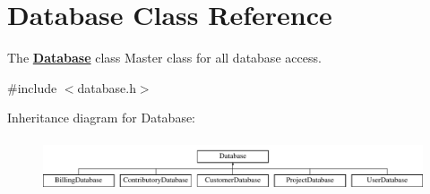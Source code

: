 \hypertarget{classDatabase}{\section{Database Class Reference}
\label{classDatabase}
}


The {\bfseries \hyperlink{classDatabase}{Database}} class Master class for all database access.  




{\ttfamily \#include $<$database.\+h$>$}

Inheritance diagram for Database\+:\begin{figure}[H]
\begin{center}
\leavevmode
\includegraphics[height=1.566434cm]{de/d03/classDatabase}
\end{center}
\end{figure}
